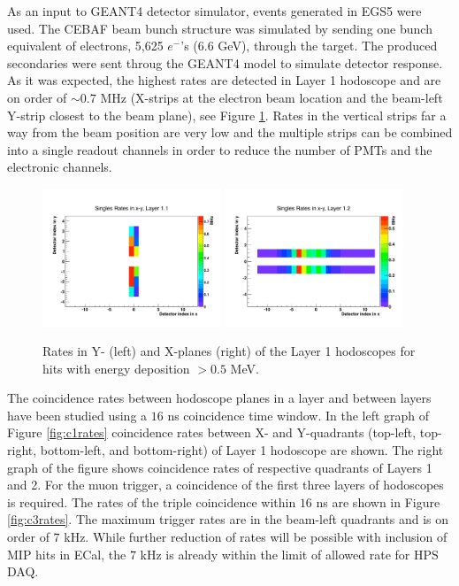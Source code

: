 As an input to GEANT4 detector simulator, events generated in EGS5 were used. The CEBAF beam bunch structure was simulated by sending one bunch 
equivalent of electrons, 5,625 $e^-$'s (6.6 GeV), through 
the target. The produced secondaries were sent throug the GEANT4 model to simulate detector response. As it was expected, the highest rates are detected in Layer 1 hodoscope and are on order of $\sim 0.7$ MHz (X-strips at the electron beam location and the beam-left Y-strip closest to the beam plane), see Figure \ref{fig:l1rates}. Rates in the vertical strips far a way from the beam position are very low and the multiple strips can be combined into a single readout channels in order to reduce the number of PMTs and the electronic channels.  

\begin{figure}[htbp]
\begin{center}
\includegraphics[width=0.475\textwidth]{performance/trigger/muon_singles1}
\includegraphics[width=0.475\textwidth]{performance/trigger/muon_singles2}
\caption{Rates in Y- (left) and X-planes (right) of the Layer 1 hodoscopes for hits with energy deposition $> 0.5$ MeV.}
\label{fig:l1rates}
\end{center}
\end{figure}

The coincidence rates between hodoscope planes in a layer and between layers have been studied using a $16$ ns coincidence time window. In the left graph of  Figure \ref{fig:c1rates} coincidence rates between X- and Y-quadrants (top-left, top-right, bottom-left, and bottom-right) of Layer 1 hodoscope are shown. The right graph of the figure shows coincidence rates of respective quadrants of Layers 1 and 2. For the muon trigger, a coincidence of the first three layers of hodoscopes is required. The rates of the triple coincidence within $16$ ns are shown in Figure \ref{fig:c3rates}. The maximum trigger rates are in the beam-left quadrants and is on order of $7$ kHz. While further reduction of rates will be possible with inclusion of MIP hits in ECal, the $7$ kHz is already within the limit of allowed rate for HPS DAQ.   

